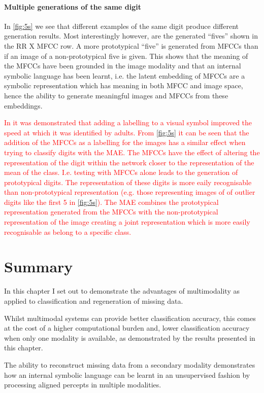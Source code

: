 \paragraph{Multiple generations of the same digit}
In \autoref{fig:5s} we see that different examples of the same digit produce different generation results. Most interestingly however, are the generated ``fives'' shown in the RR X MFCC row. A more prototypical ``five'' is generated from \acp{MFCC} than if an image of a non-prototypical five is given. This shows that the meaning of the \acp{MFCC} have been grounded in the image modality and that an internal symbolic language has been learnt, i.e. the latent embedding of \acp{MFCC} are a symbolic representation which has meaning in both \ac{MFCC} and image space, hence the ability to generate meaningful images and \acp{MFCC} from these embeddings.

\textcolor{red}{In \cite{lupyan2007reuniting} it was demonstrated that adding a labelling to a visual symbol improved the speed at which it was identified by adults. From \autoref{fig:5s} it can be seen that the addition of the MFCCs as a labelling for the images has a similar effect when trying to classify digits with the \ac{MAE}. The MFCCs have the effect of altering the representation of the digit within the network closer to the representation of the mean of the class. I.e. testing with MFCCs alone leads to the generation of prototypical digits. The representation of these digits is more eaily recognisable than non-prototypical representation (e.g. those representing images of of outlier digits like the first 5 in \autoref{fig:5s}). The \ac{MAE} combines the prototypical representation generated from the MFCCs with the non-prototypical representation of the image creating a joint representation which is more easily recognisable as belong to a specific class.}

\section{Summary}
In this chapter I set out to demonstrate the advantages of multimodality as applied to classification and regeneration of missing data.

Whilst multimodal systems can provide better classification accuracy, this comes at the cost of a higher computational burden and, lower classification accuracy when only one modality is available, as demonstrated by the results presented in this chapter.

The ability to reconstruct missing data from a secondary modality demonstrates how an internal symbolic language can be learnt in an unsupervised fashion by processing aligned percepts in multiple modalities.

